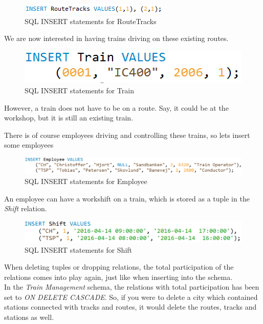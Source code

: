 \begin{figure}[ht!]
    \centering
    \includegraphics[scale=.5]{img/INSERT_Statements_RouteTracks}
    \caption{SQL INSERT statements for RouteTracks}
\end{figure}

We are now interested in having trains driving on these existing routes.

\begin{figure}[ht!]
    \centering
    \includegraphics[scale=.5]{img/INSERT_Statements_Train}
    \caption{SQL INSERT statements for Train}
\end{figure}

However, a train does not have to be on a route. Say, it could be at the 
workshop, but it is still an existing train.

There is of course employees driving and controlling these trains, so lets 
insert some employees

\begin{figure}[ht!]
    \centering
    \includegraphics[scale=.5]{img/INSERT_Statements_Employee}
    \caption{SQL INSERT statements for Employee}
\end{figure}

An employee can have a workshift on a train, which is stored as a tuple in the 
\emph{Shift} relation.

\begin{figure}[ht!]
    \centering
    \includegraphics[scale=.5]{img/INSERT_Statements_Shift}
    \caption{SQL INSERT statements for Shift}
\end{figure}

When deleting tuples or dropping relations, the total participation of the 
relations comes into play again, just like when inserting into the schema.\\
In the \emph{Train Management} schema, the relations with total participation 
has been set to \emph{ON DELETE CASCADE}. So, if you were to delete a city 
which contained stations connected with tracks and routes, it would delete the 
routes, tracks and stations as well.\\

